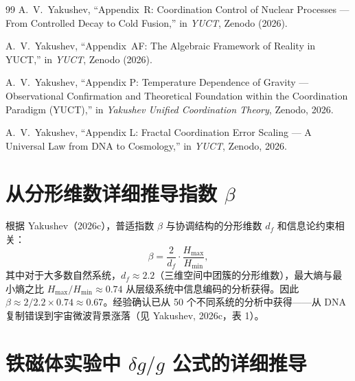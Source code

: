 \documentclass[12pt]{article}
\theoremstyle{remark}
\newcommand{\df}{d_{\!f}}
\begin{document}
\begin{thebibliography}{99}
		A.~V.~Yakushev, ``Appendix~R: Coordination Control of Nuclear Processes ---
		From Controlled Decay to Cold Fusion,''
		in \emph{YUCT}, Zenodo (2026).
		
		A.~V.~Yakushev, ``Appendix~AF: The Algebraic Framework of Reality in YUCT,''
		in \emph{YUCT}, Zenodo (2026).
		
		A.~V.~Yakushev, ``Appendix P: Temperature Dependence of Gravity — Observational Confirmation and Theoretical Foundation within the Coordination Paradigm (YUCT),'' in \emph{Yakushev Unified Coordination Theory}, Zenodo, 2026.
		
		A.~V.~Yakushev, ``Appendix L: Fractal Coordination Error Scaling — A Universal Law from DNA to Cosmology,'' in \emph{YUCT}, Zenodo, 2026.
		
	\end{thebibliography}
	
	\appendix
	
	\section{从分形维数详细推导指数 $\beta$}
	\label{app:beta-derivation}
	
	根据 Yakushev（2026c），普适指数 $\beta$ 与协调结构的分形维数 $\df$ 和信息论约束相关：
	\begin{equation}
		\beta = \frac{2}{\df} \cdot \frac{H_{\text{max}}}{H_{\text{min}}},
		\label{eq:beta-derivation}
	\end{equation}
	其中对于大多数自然系统，$\df \approx 2.2$（三维空间中团簇的分形维数），最大熵与最小熵之比 $H_{\text{max}}/H_{\text{min}} \approx 0.74$ 从层级系统中信息编码的分析获得。因此 $\beta \approx 2/2.2 \times 0.74 \approx 0.67$。经验确认已从 50 个不同系统的分析中获得——从 DNA 复制错误到宇宙微波背景涨落（见 Yakushev, 2026c，表 1）。
	
	\section{铁磁体实验中 $\delta g/g$ 公式的详细推导}
	\label{app:delta-g-derivation}
	
\end{document}
